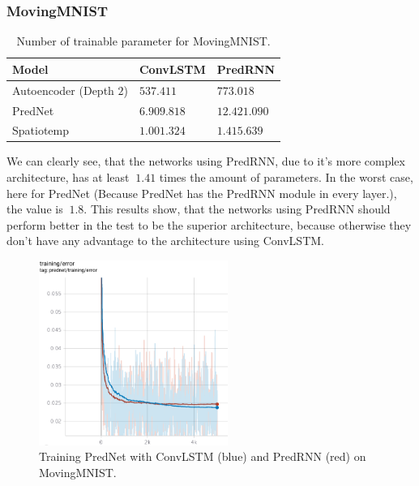   \subsubsection{MovingMNIST}
   \begin{table}[H]
    \begin{center}
     \begin{tabular}{| l | l | l |}\hline
      \textbf{Model} & \textbf{ConvLSTM} & \textbf{PredRNN} \\\hline
      Autoencoder (Depth $2$) & $537.411$ & $773.018$ \\\hline
      PredNet & $6.909.818$ & $12.421.090$ \\\hline
      Spatiotemp & $1.001.324$ & $1.415.639$ \\\hline
     \end{tabular}
    \end{center}
    \caption{Number of trainable parameter for MovingMNIST.}
   \end{table}\noindent
   We can clearly see, that the networks using PredRNN, due to it's more complex architecture, has at least $~1.41$ times the amount of parameters. In the worst
   case, here for PredNet (Because PredNet has the PredRNN module in every layer.), the value is $~1.8$. This results show, that the networks using PredRNN
   should perform better in the test to be the superior architecture, because otherwise they don't have any advantage to the architecture using ConvLSTM.
   \begin{figure}[H]
    \includegraphics[width=0.55\textwidth]{../Images/prednet_mnist_training.png}
    \centering
    \caption{Training PredNet with ConvLSTM (blue) and PredRNN (red) on MovingMNIST.}
    \label{fig:prednet_mnist_training}
   \end{figure}\noindent
